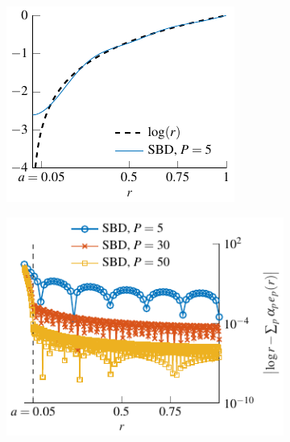 \documentclass[smallextended]{svjour3}
\begin{document}
\begin{figure}[ht]
	\newlength{\plotwidth}
	\setlength{\plotwidth}{0.49\textwidth}
	\centering		
	\begin{subfigure}[b]{\plotwidth}
		\centering
		\includegraphics[scale = 0.85]{LogVsSBD}
		\caption{}
	\end{subfigure}%
	\hspace{1.5pt}
	\begin{subfigure}[b]{\plotwidth}
		\centering
		\includegraphics[scale = 0.85]{ErrorVariousGamma}
		\caption{}
	\end{subfigure}%
																																																																								

\end{figure}
\end{document}
